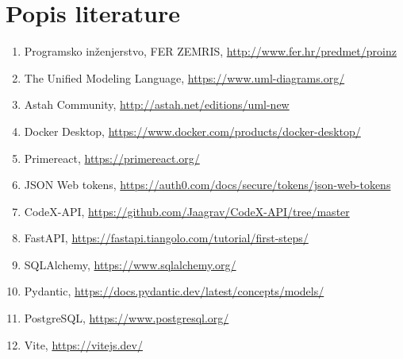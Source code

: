 \chapter*{Popis literature}
		
		
		\begin{enumerate}
			
			
			\item  Programsko inženjerstvo, FER ZEMRIS, \url{http://www.fer.hr/predmet/proinz}
			
			\item  The Unified Modeling Language, \url{https://www.uml-diagrams.org/}
			
			\item  Astah Community, \url{http://astah.net/editions/uml-new}
			
			\item  Docker Desktop, \url{https://www.docker.com/products/docker-desktop/}
			
			\item  Primereact, \url{https://primereact.org/}
			
			\item  JSON Web tokens, \url{https://auth0.com/docs/secure/tokens/json-web-tokens}
			
			\item  CodeX-API, \url{https://github.com/Jaagrav/CodeX-API/tree/master}
			
			\item  FastAPI, \url{https://fastapi.tiangolo.com/tutorial/first-steps/}
			
			\item SQLAlchemy, \url{https://www.sqlalchemy.org/}
			
			\item Pydantic, \url{https://docs.pydantic.dev/latest/concepts/models/}
			
			\item PostgreSQL, \url{https://www.postgresql.org/}
			
			\item Vite, \url{https://vitejs.dev/}
		\end{enumerate}
		
		 